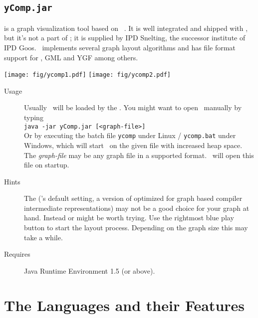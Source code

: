 \subsection{\texttt{yComp.jar}}
\label{tools:ycomp}
\yComp{} \cite{ycomp} is a graph visualization tool based on \yFiles\ \cite{yfiles}.
It is well integrated and shipped with \GrG, but it's not a part of \GrG; it is supplied by IPD Snelting, the successor institute of IPD Goos.%
\yComp\ implements several graph layout algorithms and has file format support for , GML and YGF among others.
\begin{center}
\texttt{[image: fig/ycomp1.pdf]} \texttt{[image: fig/ycomp2.pdf]}
\end{center}
\begin{description}
  \item[Usage] Usually \yComp\ will be loaded by the \GrShell. You might want to open \yComp\ manually by typing\\
   \texttt{java -jar yComp.jar [<graph-file>]}\\
  Or by executing the batch file \texttt{ycomp} under Linux / \texttt{ycomp.bat} under Windows,
  which will start \yComp\ on the given file with increased heap space.
  The \emph{graph-file} may be any graph file in a supported format. \yComp\ will open this file on startup.
  \item[Hints] The   (\yComp's default setting, a version of \texttt{} optimized for graph based compiler intermediate representations) may not be a good choice for your graph at hand.
  Instead \texttt{} or \texttt{} might be worth trying.
  Use the rightmost blue play button to start the layout process. Depending on the graph size this may take a while.
  \item[Requires] Java Runtime Environment 1.5 (or above).
\end{description}


\section{The Languages and their Features}

